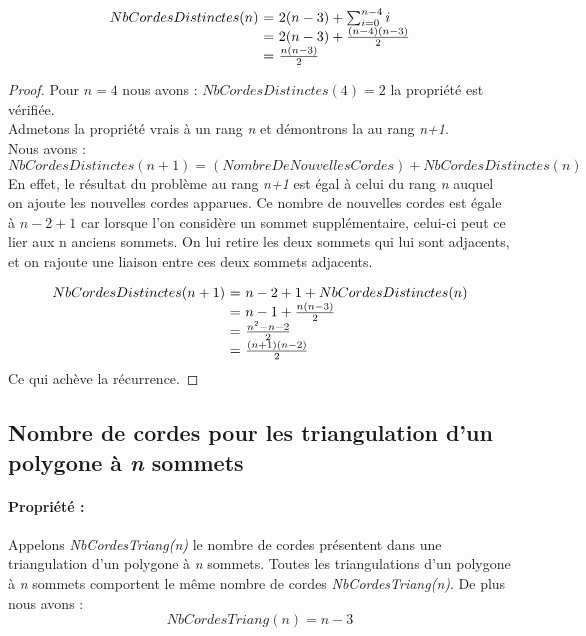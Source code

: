 \documentclass[a4paper,10pt]{article}
\begin{document}
\begin{equation} 
\begin{array}{r @{=} l}
NbCordesDistinctes(n) \ & \ 2(n-3) + \sum_{i=0}^{n-4} i \\
		      & \ 2(n-3) + \frac{(n-4)(n-3)}{2} \\
		      & \ \frac{n(n-3)}{2}
\end{array} 
\end{equation}


\begin{proof}
Pour \(n = 4\) nous avons : \(NbCordesDistinctes(4)=2 \) la propriété est vérifiée. \\
Admetons la propriété vrais à un rang \emph{n} et démontrons la au rang \emph{n+1}. \\
Nous avons :\\
\[NbCordesDistinctes(n+1) = (NombreDeNouvellesCordes) + NbCordesDistinctes(n)\]
En effet, le résultat du problème au rang \emph{n+1} est égal à celui du rang \emph{n} auquel on ajoute les nouvelles cordes apparues.
Ce nombre de nouvelles cordes est égale à \(n - 2 + 1 \) car lorsque l'on considère un sommet supplémentaire, celui-ci peut ce lier aux n anciens sommets.
On lui retire les deux sommets qui lui sont adjacents, et on rajoute une liaison entre ces deux sommets adjacents.


\[
\begin{array}{r @{=} l}
NbCordesDistinctes(n+1) \ & \ n -  2 + 1 + NbCordesDistinctes(n) \\
			  & \ n - 1 + \frac{n(n-3)}{2} \\
			  & \ \frac{{n^2}-n-2}{2} \\
			  & \ \frac{(n+1)(n-2)}{2} \\
\end{array}
\]
Ce qui achève la récurrence.	
\end{proof}


\subsection{Nombre de cordes pour les triangulation d'un polygone à \emph{n} sommets}

\paragraph{Propriété :}  
Appelons \emph{NbCordesTriang(n)} le nombre de cordes présentent dans une triangulation d'un polygone à \emph{n} sommets.
Toutes les triangulations d'un polygone à \emph{n} sommets comportent le même nombre de cordes \emph{NbCordesTriang(n)}.
De plus nous avons :
\begin{equation} 
NbCordesTriang(n) = n-3
\end{equation}
\end{document}
